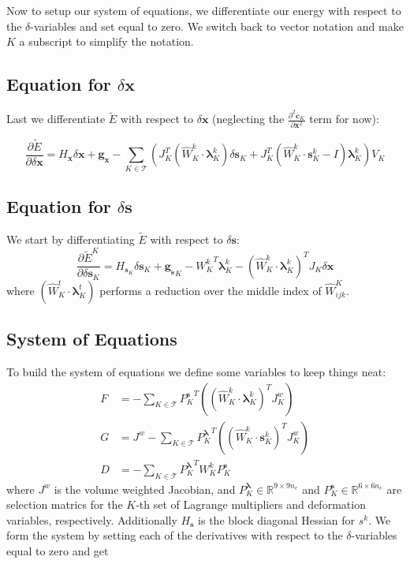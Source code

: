 \documentclass[letterpaper,12pt]{article}
\theoremstyle{remark}
\newcommand{\R}{\mathbb{R}}
\newcommand{\Th}{\mathcal{T}}
\newcommand{\x}{\mathbf{x}}
\newcommand{\C}{\mathbf{c}}
\newcommand{\s}{\mathbf{s}}
\newcommand{\la}{\mathbf{\lambda}}
\newcommand{\dx}{\delta \x}
\newcommand{\ds}{\delta \s}
\newcommand{\Hx}{ {H_\x} }
\newcommand{\Hs}{ {H_\s} }
\newcommand{\Hsk}{ {H_{\s_K}} }
\newcommand{\gx}{ {\mathbf{g}_\x} }
\newcommand{\gs}{ {\mathbf{g}_\s} }
\begin{document}
Now to setup our system of equations, we differentiate our energy with respect to the $\delta$-variables and set equal to zero. We switch back to vector notation and make $K$ a subscript to simplify the notation.


\subsection{Equation for $\dx$}
Last we differentiate $\tilde{E}$ with respect to $\dx$ (neglecting the $\frac{\partial^2 \C_K}{ \partial \x^2}$ term for now):

\begin{equation}
\frac{\partial \tilde{E}}{\partial \dx} = \Hx\dx + \gx 
- \sum_{K \in \Th} \left(
J_K^T(\hat{W}_K^{k}\cdot \la_K^k) \ds_K +
J_K^T(\hat{W}_K^{k}\cdot \s_K^k - I)\la_K^k
\right)V_K
\end{equation}


\subsection{Equation for $\ds$}
We start by differentiating $\tilde{E}$ with respect to $\ds$:
\begin{equation}
\frac{\partial \tilde{E}^K}{\partial \ds_K} =  \Hsk \ds_K + \gs_K  -
{W_K^k}^T \la_K^k - (\hat{W}_K^{k}\cdot \la_K^k)^T J_K \dx
\end{equation}
where $(\hat{W}_K^{t}\cdot \la_K^t)$ performs a reduction over the middle index of $\hat{W}^K_{ijk}$.


\subsection{System of Equations}
To build the system of equations we define some variables to keep things neat:
\begin{align}
F &= - \sum_{K \in \Th} {P_K^\s}^T \left((\hat{W}_K^{k}\cdot \la_K^k)^T J_K^w \right) \\
G &= J^w - \sum_{K \in \Th} {P_K^\la}^T \left((\hat{W}_K^{k}\cdot \s_K^k)^T J_K^w \right) \\
D &= -\sum_{K \in \Th} {P_K^\la}^T  W_K^k P_K^\s
\end{align}
where $J^w$ is the volume weighted Jacobian, and $P_K^\la \in \R^{9 \times 9n_e}$ and $P_K^\s \in \R^{6 \times 6n_e}$ are selection matrics for the $K$-th set of Lagrange multipliers and deformation variables, respectively. Additionally $\Hs$ is the block diagonal Hessian for $s^k$. We form the system by setting each of the derivatives with respect to the $\delta$-variables equal to zero and get
\end{document}
